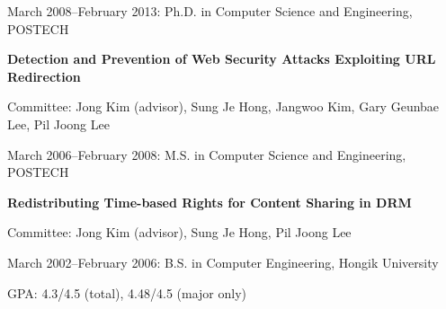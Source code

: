 \documentclass[letterpaper]{article}
\renewenvironment{itemize}{
  \begin{list}{}{
    \setlength{\leftmargin}{1.5em}
  }
}{
  \end{list}
}
\begin{document}
\begin{itemize}
  \item March 2008--February 2013: Ph.D. in Computer Science and Engineering, POSTECH
  \begin{itemize}
  \item \textbf{Detection and Prevention of Web Security Attacks Exploiting URL Redirection}
  \item Committee: Jong Kim (advisor), Sung Je Hong, Jangwoo Kim, Gary Geunbae Lee, Pil Joong Lee
  \end{itemize}
  \item March 2006--February 2008: M.S. in Computer Science and Engineering, POSTECH
  \begin{itemize}
  \item \textbf{Redistributing Time-based Rights for Content Sharing in DRM}
  \item Committee: Jong Kim (advisor), Sung Je Hong, Pil Joong Lee
  \end{itemize}  
  \item March 2002--February 2006: B.S. in Computer Engineering, Hongik University %
  \begin{itemize}
  \item GPA: 4.3/4.5 (total), 4.48/4.5 (major only)
  \end{itemize}  
\end{itemize}


\end{document}

